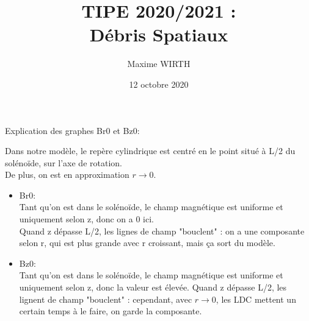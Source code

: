 \documentclass{article}
\author{Maxime WIRTH}
\title{TIPE 2020/2021 : \\ Débris Spatiaux}
\date{12 octobre 2020}
\begin{document}
\maketitle

Explication des graphes Br0 et Bz0:

Dans notre modèle, le repère cylindrique est centré en le point situé à L/2 du solénoïde, sur l'axe de rotation.\\
De plus, on est en approximation $ r \to 0 $.

\begin{itemize}
    \item Br0:\\
        Tant qu'on est dans le solénoïde, le champ magnétique est uniforme et uniquement selon z, donc on a 0 ici.\\
        Quand z dépasse L/2, les lignes de champ "bouclent" : on a une composante selon r, qui est plus 
        grande avec r croissant, mais ça sort du modèle.
    \item Bz0:\\
        Tant qu'on est dans le solénoïde, le champ magnétique est uniforme et uniquement selon z, donc la 
        valeur est élevée.
        Quand z dépasse L/2, les lignent de champ "bouclent" : cependant, avec $r \to 0$, les LDC mettent
        un certain temps à le faire, on garde la composante.
\end{itemize}
\end{document}
